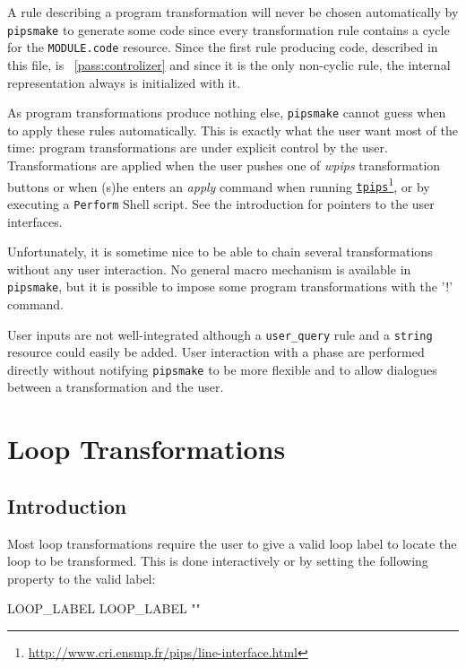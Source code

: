 \documentclass[a4paper]{report}
\newcommand{\PipsPassRef}[1]{\texttt{\detokenize{#1}}~\ref{pass:#1}}
\newenvironment{PipsPass}[1]{\label{pass:#1}}{}
\newcommand{\LINK}[2]{\href{#2}{#1}\footnote{\url{#2}}\xspace}
\newcommand{\Pipsmake}{\texttt{pipsmake}}
\newcommand{\TPIPS}{\LINK{\texttt{tpips}}{http://www.cri.ensmp.fr/pips/line-interface.html}}
\newcommand{\WPIPS}{{\em wpips}}
\begin{document}
\begin{PipsPass}{TheTransformationsAtEnd}
A rule describing a program transformation will never be chosen
automatically by \Pipsmake{} to generate some code since every
transformation rule contains a cycle for the \verb+MODULE.code+
resource. Since the first rule producing code, described in this file,
is \PipsPassRef{controlizer} and since it is the only non-cyclic rule, the
internal representation always is initialized with it.

As program transformations produce nothing else, \Pipsmake{} cannot guess
when to apply these rules automatically. This is exactly what the user
want most of the time: program transformations are under explicit
control by the user. Transformations are applied when the user pushes
one of \WPIPS{} transformation buttons or when (s)he enters an {\em
apply} command when running \TPIPS{}, or by executing a
\verb+Perform+ Shell script. See the introduction for pointers to the
user interfaces.

Unfortunately, it is sometime nice to be able to chain several
transformations without any user interaction. No general macro mechanism is
available in \Pipsmake{}, but it is possible to impose some program
transformations with the '!' command.

User inputs are not well-integrated although a \verb+user_query+ rule
and a \verb+string+ resource could easily be added. User interaction
with a phase are performed directly without notifying \Pipsmake{} to be
more flexible and to allow dialogues between a transformation and the user.
\end{PipsPass}



\section{Loop Transformations}

\subsection{Introduction}

Most loop transformations require the user to give a valid loop label to locate the loop to be transformed.
This is done interactively or by setting the following property to the valid label:
\begin{PipsProp}{LOOP_LABEL}
LOOP_LABEL ""
\end{PipsProp}
\end{document}
